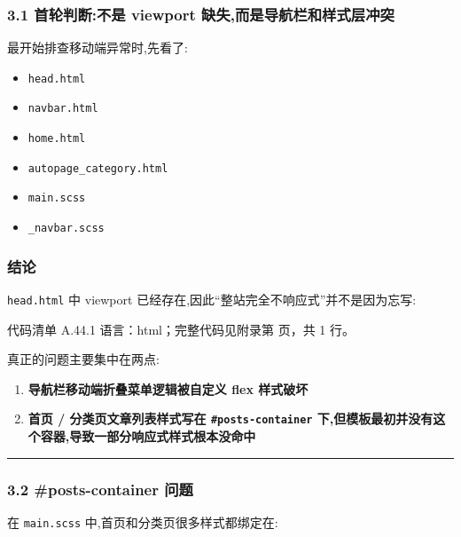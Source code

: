 \documentclass[lang=cn,scheme=chinese,color=blue,device=normal,toc=onecol,math=cm]{elegantbook}
\begin{document}
\subsubsection{3.1 首轮判断:不是 viewport 缺失,而是导航栏和样式层冲突}


最开始排查移动端异常时,先看了:\par


\begin{itemize}
\item \texttt{head.html}
\item \texttt{navbar.html}
\item \texttt{home.html}
\item \texttt{autopage\_\allowbreak{}category.html}
\item \texttt{main.scss}
\item \texttt{\_\allowbreak{}navbar.scss}
\end{itemize}


\subsubsection{结论}


\texttt{head.html} 中 viewport 已经存在,因此“整站完全不响应式”并不是因为忘写:\par


\begin{codeindexbox}{代码清单 A.44.1}
语言：html；完整代码见附录第 \pageref{code:44:1} 页，共 1 行。
\end{codeindexbox}


真正的问题主要集中在两点:\par


\begin{enumerate}
\item \textbf{导航栏移动端折叠菜单逻辑被自定义 flex 样式破坏}
\item \textbf{首页 /\allowbreak{} 分类页文章列表样式写在 \texttt{\#posts-container} 下,但模板最初并没有这个容器,导致一部分响应式样式根本没命中}
\end{enumerate}


\medskip\hrule\medskip


\subsubsection{3.2 \#posts-container 问题}


在 \texttt{main.scss} 中,首页和分类页很多样式都绑定在:\par
\end{document}
